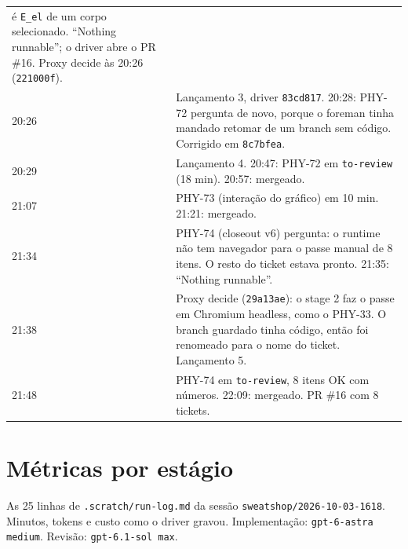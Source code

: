\documentclass[11pt,a4paper]{article}
\begin{document}
\begin{tabularx}{\linewidth}{@{}lX@{}}
        é \texttt{E\_el} de um corpo selecionado. ``Nothing runnable''; o driver
        abre o PR \#16. Proxy decide às 20:26 (\texttt{221000f}).\\
20:26 & Lançamento 3, driver \texttt{83cd817}. 20:28: PHY-72 pergunta de novo,
        porque o foreman tinha mandado retomar de um branch sem código.
        Corrigido em \texttt{8c7bfea}.\\
20:29 & Lançamento 4. 20:47: PHY-72 em \texttt{to-review} (18 min). 20:57:
        mergeado.\\
21:07 & PHY-73 (interação do gráfico) em 10 min. 21:21: mergeado.\\
21:34 & PHY-74 (closeout v6) pergunta: o runtime não tem navegador para o passe
        manual de 8 itens. O resto do ticket estava pronto.
        21:35: ``Nothing runnable''.\\
21:38 & Proxy decide (\texttt{29a13ae}): o stage 2 faz o passe em Chromium
        headless, como o PHY-33. O branch guardado tinha código, então foi
        renomeado para o nome do ticket. Lançamento 5.\\
21:48 & PHY-74 em \texttt{to-review}, 8 itens OK com números. 22:09:
        mergeado. PR \#16 com 8 tickets.\\
\bottomrule
\end{tabularx}

\section{Métricas por estágio}

As 25 linhas de \texttt{.scratch/run-log.md} da sessão
\texttt{sweatshop/2026-10-03-1618}. Minutos, tokens e custo como o driver
gravou. Implementação: \texttt{gpt-6-astra medium}. Revisão:
\texttt{gpt-6.1-sol max}.
\end{document}

